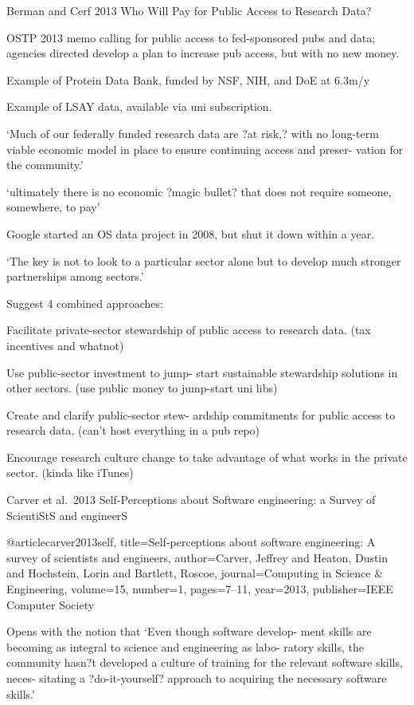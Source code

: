 \documentclass[12pt]{amsart}
\begin{document}
Berman and Cerf 2013 Who Will Pay for Public Access to Research Data?

OSTP 2013 memo calling for public access to fed-sponsored pubs and data; agencies directed develop a plan to increase pub access, but with no new money.

Example of Protein Data Bank, funded by NSF, NIH, and DoE at 6.3m/y

Example of LSAY data, available via uni subscription.

`Much of our federally funded research data are ?at risk,? with no long-term viable economic model in place to ensure continuing access and preser- vation for the community.'

`ultimately there is no economic ?magic bullet? that does not require someone, somewhere, to pay'

Google started an OS data project in 2008, but shut it down within a year.

`The key is not to look to a particular sector alone but to develop much stronger partnerships among sectors.'

Suggest 4 combined approaches:

Facilitate private-sector stewardship of public access to research data. (tax incentives and whatnot)

Use public-sector investment to jump- start sustainable stewardship solutions in other sectors. (use public money to jump-start uni libs)

Create and clarify public-sector stew- ardship commitments for public access to research data. (can't host everything in a pub repo)

Encourage research culture change to take advantage of what works in the private sector. (kinda like iTunes)





Carver et al.\, 2013 Self-Perceptions about Software engineering: a Survey of ScientiStS and engineerS

@article{carver2013self,
  title={Self-perceptions about software engineering: A survey of scientists and engineers},
  author={Carver, Jeffrey and Heaton, Dustin and Hochstein, Lorin and Bartlett, Roscoe},
  journal={Computing in Science \& Engineering},
  volume={15},
  number={1},
  pages={7--11},
  year={2013},
  publisher={IEEE Computer Society}
}

Opens with the notion that `Even though software develop- ment skills are becoming as integral to science and engineering as labo- ratory skills, the community hasn?t developed a culture of training for the relevant software skills, neces- sitating a ?do-it-yourself? approach to acquiring the necessary software skills.'
\end{document}
